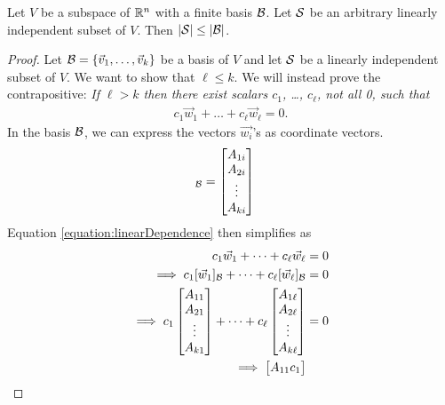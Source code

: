 \begin{proposition}
  \label{proposition:sizeOfLinIndependentSets}
  Let $V$ be a subspace of $\mathbb{R}^n$ with a finite basis $\mathcal{B}$.
  Let $\mathcal{S}$ be an arbitrary linearly independent subset of $V$.
  Then $\left\lvert \mathcal{S} \right\rvert \le \left\lvert \mathcal{B} \right\rvert$.
\end{proposition}
\begin{proof}
  Let $\mathcal{B} = \left\{\vec{v}_1, \dots, \vec{v}_k\right\}$ be a basis of $V$ and let $\mathcal{S}$ be a linearly independent subset of $V$. We want to show that $\ell \le k$.
  We will instead prove the contrapositive:
  {\it If  $\ell > k$ then there exist scalars $c_1$, \dots, $c_{\ell}$, not all 0, such that \begin{align}
  \label{equation:linearDependence}
    c_1\vec{w}_1 + \dots + c_\ell \vec{w}_\ell= 0.
  \end{align}}
  In the basis $\mathcal{B}$, we can express the vectors $\vec{w_i}$'s as coordinate vectors.
  \begin{align*}
    [w_i]_{\calb}
    &=
    \begin{bmatrix}
      A_{1i} \\
      A_{2i} \\
      \vdots \\
      A_{ki}
    \end{bmatrix}
  \end{align*}
  Equation \eqref{equation:linearDependence} then simplifies as
  \begin{align*}
    c_1\vec{w}_1 + \dots + c_\ell \vec{w}_\ell&= 0 \\
    \implies %
    c_1[\vec{w}_1]_\calb + \dots + c_\ell [\vec{w}_\ell]_\calb&= 0 \\
    \implies %
    c_1 \begin{bmatrix}
      A_{11} \\
      A_{21} \\
      \vdots \\
      A_{k1}
    \end{bmatrix}
    +
    \dots
    +
    c_\ell \begin{bmatrix}
      A_{1\ell} \\
      A_{2\ell} \\
      \vdots \\
      A_{k\ell}
    \end{bmatrix}
    &= 0 \\
    \implies
    \begin{bmatrix}
      A_{11}c_1 \\

\end{bmatrix}
\end{align*}
\end{proof}
